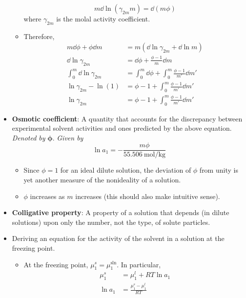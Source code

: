 \documentclass[../notes.tex]{subfiles}
\begin{document}
\begin{itemize}
\begin{itemize}
        \begin{equation*}
            m\dd{\ln(\gamma_{2m}m)} = \dd{(m\phi)}
        \end{equation*}
        where $\gamma_{2m}$ is the molal activity coefficient.
        \item Therefore,
        \begin{align*}
            m\dd{\phi}+\phi\dd{m} &= m(\dd{\ln\gamma_{2m}}+\dd{\ln m})\\
            \dd{\ln\gamma_{2m}} &= \dd{\phi}+\frac{\phi-1}{m}\dd{m}\\
            \int_0^m\dd{\ln\gamma_{2m}} &= \int_0^m\dd{\phi}+\int_0^m\frac{\phi-1}{m'}\dd{m'}\\
            \ln\gamma_{2m}-\ln(1) &= \phi-1+\int_0^m\frac{\phi-1}{m'}\dd{m'}\\
            \ln\gamma_{2m} &= \phi-1+\int_0^m\frac{\phi-1}{m'}\dd{m'}
        \end{align*}
    \end{itemize}
    \item \textbf{Osmotic coefficient}: A quantity that accounts for the discrepancy between experimental solvent activities and ones predicted by the above equation. \emph{Denoted by} $\bm{\phi}$. \emph{Given by}
    \begin{equation*}
        \ln a_1 = -\frac{m\phi}{\SI{55.506}{\mole\per\kilo\gram}}
    \end{equation*}
    \begin{itemize}
        \item Since $\phi=1$ for an ideal dilute solution, the deviation of $\phi$ from unity is yet another measure of the nonideality of a solution.
        \item $\phi$ increases as $m$ increases (this should also make intuitive sense).
    \end{itemize}
    \item \textbf{Colligative property}: A property of a solution that depends (in dilute solutions) upon only the number, not the type, of solute particles.
    \item Deriving an equation for the activity of the solvent in a solution at the freezing point.
    \begin{itemize}
        \item At the freezing point, $\mu_1^s=\mu_1^\text{sln}$. In particular,
        \begin{align*}
            \mu_1^s &= \mu_1^l+RT\ln a_1\\
            \ln a_1 &= \frac{\mu_1^s-\mu_1^l}{RT}

\end{align*}
\end{itemize}
\end{itemize}
\end{document}
